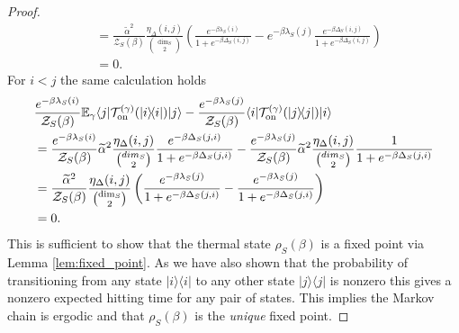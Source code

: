 \documentclass{article}
\newcommand{\on}{\rm on}
\newcommand{\ket}[1]{|#1\rangle}
\newcommand{\bra}[1]{\langle #1|}
\newcommand{\ketbra}[2]{| #1\rangle\! \langle #2|}
\newcommand{\EE}{\mathbb{E}}
\newcommand{\TT}{\mathcal{T}}
\newcommand{\partfun}{\mathcal{Z}}
\begin{document}
\begin{proof}
\begin{align}
    &= \frac{\widetilde{\alpha}^2}{\partfun_S(\beta)} \frac{\eta_\Delta(i,j)}{\binom{\dim_S}{2}} \left(\frac{e^{-\beta \lambda_S(i)}}{1 + e^{-\beta \Delta_S(i,j)}} - e^{-\beta \lambda_S(j)} \frac{e^{-\beta \Delta_S(i,j)}}{1 + e^{-\beta \Delta_S(i,j)} } \right) \\
    &= 0.
\end{align}
For $i < j$ the same calculation holds
\begin{align}
    &\frac{e^{-\beta \lambda_S(i)}}{\partfun_S(\beta)} \EE_\gamma \bra{j} \TT_{\on}^{(\gamma)}(\ketbra{i}{i}) \ket{j} - \frac{e^{-\beta \lambda_S(j)}}{\partfun_S(\beta)} \bra{i} \TT_{\on}^{(\gamma)}(\ketbra{j}{j}) \ket{i} \nonumber \\
    &= \frac{e^{-\beta \lambda_S(i)}}{\partfun_S(\beta)} \widetilde{\alpha}^2 \frac{\eta_\Delta(i,j)}{\binom{dim_S}{2}} \frac{e^{-\beta \Delta_S(j, i)}}{1 + e^{-\beta \Delta_S(j, i)}} - \frac{e^{-\beta \lambda_S(j)}}{\partfun_S(\beta)} \widetilde{\alpha}^2 \frac{\eta_\Delta(i,j)}{\binom{dim_S}{2}} \frac{1}{1 + e^{-\beta \Delta_S(j, i)}} \\
    &= \frac{\widetilde{\alpha}^2}{\partfun_S(\beta)} \frac{\eta_\Delta(i,j)}{\binom{\dim_S}{2}} \left(\frac{e^{-\beta \lambda_S(j)}}{1 + e^{-\beta \Delta_S(j, i)}} - \frac{e^{-\beta \lambda_S(j)}}{1 + e^{-\beta \Delta_S(j, i)} } \right) \\
    &= 0.
\end{align}
This is sufficient to show that the thermal state $\rho_S(\beta)$ is a fixed point via Lemma \ref{lem:fixed_point}. As we have also shown that the probability of transitioning from any state $\ketbra{i}{i}$ to any other state $\ketbra{j}{j}$ is nonzero this gives a nonzero expected hitting time for any pair of states. This implies the Markov chain is ergodic and that $\rho_S(\beta)$ is the \emph{unique} fixed point.


\end{proof}
\end{document}
